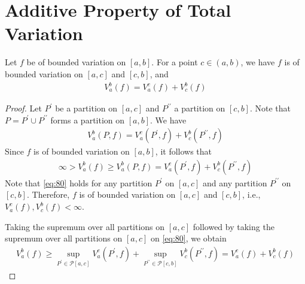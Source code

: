 \documentclass[thmcnt=section, 12pt]{my-elegantbook}
\begin{document}
\section{Additive Property of Total Variation}


\begin{theorem} \label{thm:34}
    Let $f$ be of bounded variation on $[a, b]$. For a point $c \in (a, b)$, we have $f$ is of bounded variation on $[a, c]$ and $[c, b]$, and 
    \begin{align}
        V_a^b(f) = V_a^c(f) + V_c^b(f)
        \label{eq:79}
    \end{align}
\end{theorem}

\begin{proof}
    Let $P^\prime$ be a partition on $[a, c]$ and $P^{\prime\prime}$ a partition on $[c, b]$. Note that $P = P^\prime \cup P^{\prime\prime}$ forms a partition on $[a, b]$. We have
    \begin{align*}
        V_a^b(P, f) = V_a^c(P^\prime, f) + V_c^b(P^{\prime\prime}, f)
    \end{align*}
    Since $f$ is of bounded variation on $[a, b]$, it follows that 
    \begin{align}
        \infty > V_a^b(f) 
        \geq V_a^b(P, f) 
        = V_a^c(P^\prime, f) + V_c^b(P^{\prime\prime}, f)
        \label{eq:80}
    \end{align}
    Note that \eqref{eq:80} holds for any partition $P^\prime$ on $[a, c]$ and any partition $P^{\prime\prime}$ on $[c, b]$. Therefore, $f$ is of bounded variation on $[a, c]$ and $[c, b]$, i.e., $V_a^c(f), V_c^b(f) < \infty$.

    Taking the supremum over all partitions on $[a, c]$ followed by taking the supremum over all partitions on $[a, c]$ on \eqref{eq:80}, we obtain
    \begin{align}
        V_a^b(f) 
        \geq \sup_{P^\prime \in \mathcal{P}[a, c]} V_a^c(P^\prime, f) 
        + \sup_{P^{\prime\prime} \in \mathcal{P}[c, b]} V_c^b(P^{\prime\prime}, f)
        = V_a^c(f) + V_c^b(f)
        \label{eq:81}
    \end{align}


\end{proof}
\end{document}
